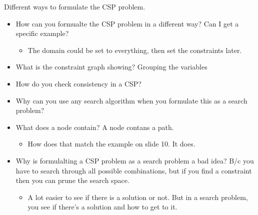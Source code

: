 \begin{example}
    Different ways to formulate the CSP problem. 
    \begin{itemize}
        \item How can you formualte the CSP problem in a different way? Can I get a specific example?
        \begin{itemize}
            \item The domain could be set to everything, then set the constraints later.
        \end{itemize}
        \item What is the constraint graph showing? Grouping the variables
        \item How do you check consistency in a CSP?
        \item Why can you use any search algorithm when you formulate this as a search problem? 
        \item What does a node contain? A node contans a path. 
        \begin{itemize}
            \item How does that match the example on slide 10. It does. 
        \end{itemize}
        \item Why is formulalting a CSP problem as a search problem a bad idea? B/c you have to search through all possible combinations, but if you find a constraint then you can prune the search space.
        \begin{itemize}
            \item A lot easier to see if there is a solution or not. But in a search problem, you see if there's a solution and how to get to it. 
        \end{itemize}
    \end{itemize}
\end{example}
\newpage

